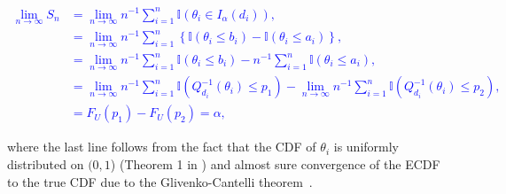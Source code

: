 \documentclass[oneside]{article}
\begin{document}
\textcolor{blue}{
\begin{align*}
\lim_{n \to \infty} S_n &= \lim_{n \to \infty} n^{-1}\sum_{i=1}^n \mathbb{I}\left(\theta_i \in I_{\alpha}\left(d_i\right) \right),\\
&=  \lim_{n \to \infty} n^{-1}\sum_{i=1}^n \left\{ \mathbb{I}\left(\theta_i \leq b_i \right) - \mathbb{I}\left(\theta_i \leq a_i \right) \right\},\\
&=  \lim_{n \to \infty} n^{-1}\sum_{i=1}^n \mathbb{I}\left(\theta_i \leq b_i \right) -  n^{-1}\sum_{i=1}^n\mathbb{I}\left(\theta_i \leq a_i \right),\\
&=  \lim_{n \to \infty} n^{-1}\sum_{i=1}^n \mathbb{I}\left(Q_{d_i}^{-1}\left(\theta_i\right) \leq p_1 \right) -   \lim_{n \to \infty} n^{-1}\sum_{i=1}^n\mathbb{I}\left(Q_{d_i}^{-1}\left(\theta_i\right) \leq p_2 \right),\\
&= F_U(p_1) - F_U(p_2) = \alpha,
\end{align*}
}

\noindent where the last line follows from the fact that the CDF of $\theta_i$ is uniformly distributed on $(0, 1$) (Theorem 1 in \cite{Cook2006}) and almost sure convergence of the ECDF to the true CDF due to the  Glivenko-Cantelli theorem~\cite[page 275]{Billingsley1986}.


\end{document}
